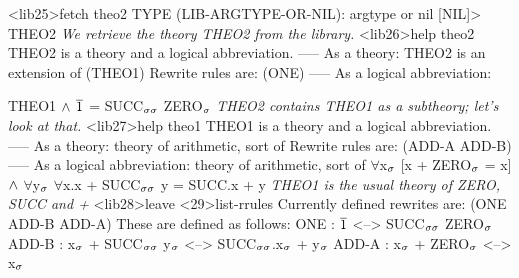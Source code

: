 \begin{tpsexample}
<lib25>fetch theo2
TYPE (LIB-ARGTYPE-OR-NIL): argtype or nil [NIL]>
THEO2
{\it We retrieve the theory THEO2 from the library.}
<lib26>help theo2
THEO2 is a theory and a logical abbreviation.
     -----
As a theory:
THEO2 is an extension of (THEO1)
Rewrite rules are: (ONE)
     -----
As a logical abbreviation:

THEO1 \(\mathord{\wedge}\) \(\mathord{\overline{1}}\) = SUCC\(\sb{\sigma\sigma}\) ZERO\(\sb{\sigma}\)
{\it THEO2 contains THEO1 as a subtheory; let's look at that.}
<lib27>help theo1
THEO1 is a theory and a logical abbreviation.
     -----
As a theory:
theory of arithmetic, sort of
Rewrite rules are: (ADD-A ADD-B)
     -----
As a logical abbreviation:
theory of arithmetic, sort of
\(\forall\)x\(\sb{\sigma}\) [x + ZERO\(\sb{\sigma}\) = x] \(\mathord{\wedge}\) \(\forall\)y\(\sb{\sigma}\) \(\forall\)x.x + SUCC\(\sb{\sigma\sigma}\) y = SUCC.x + y
{\it THEO1 is the usual theory of ZERO, SUCC and +}
<lib28>leave
<29>list-rrules
Currently defined rewrites are: (ONE ADD-B ADD-A)
These are defined as follows:
ONE : \(\mathord{\overline{1}}\) <--> SUCC\(\sb{\sigma\sigma}\) ZERO\(\sb{\sigma}\)
ADD-B : x\(\sb{\sigma}\) + SUCC\(\sb{\sigma\sigma}\) y\(\sb{\sigma}\) <--> SUCC\(\sb{\sigma\sigma}\).x\(\sb{\sigma}\) + y\(\sb{\sigma}\)
ADD-A : x\(\sb{\sigma}\) + ZERO\(\sb{\sigma}\) <--> x\(\sb{\sigma}\)


\end{tpsexample}
